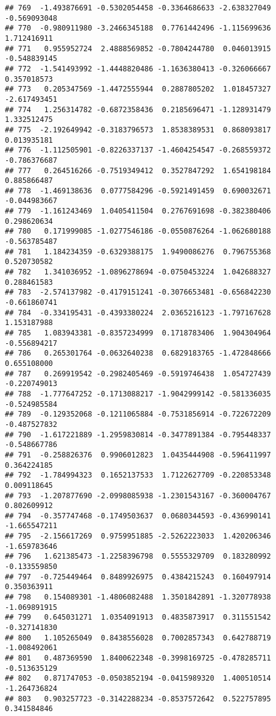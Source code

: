 \documentclass[
]{article}
\begin{document}
\begin{verbatim}
## 769  -1.493876691 -0.5302054458 -0.3364686633 -2.638327049 -0.569093048
## 770  -0.980911980 -3.2466345188  0.7761442496 -1.115699636  1.712416911
## 771   0.955952724  2.4888569852 -0.7804244780  0.046013915 -0.548839145
## 772  -1.541493992 -1.4448820486 -1.1636380413 -0.326066667  0.357018573
## 773   0.205347569 -1.4472555944  0.2887805202  1.018457327 -2.617493451
## 774   1.256314782 -0.6872358436  0.2185696471 -1.128931479  1.332512475
## 775  -2.192649942 -0.3183796573  1.8538389531  0.868093817  0.013935181
## 776  -1.112505901 -0.8226337137 -1.4604254547 -0.268559372 -0.786376687
## 777   0.264516266 -0.7519349412  0.3527847292  1.654198184  0.885866487
## 778  -1.469138636  0.0777584296 -0.5921491459  0.690032671 -0.044983667
## 779  -1.161243469  1.0405411504  0.2767691698 -0.382380406  0.298620634
## 780   0.171999085 -1.0277546186 -0.0550876264 -1.062680188 -0.563785487
## 781   1.184234359 -0.6329388175  1.9490086276  0.796755368  0.520730582
## 782   1.341036952 -1.0896278694 -0.0750453224  1.042688327  0.288461583
## 783  -2.574137982 -0.4179151241 -0.3076653481 -0.656842230 -0.661860741
## 784  -0.334195431 -0.4393380224  2.0365216123 -1.797167628  1.153187988
## 785   1.083943381 -0.8357234999  0.1718783406  1.904304964 -0.556894217
## 786   0.265301764 -0.0632640238  0.6829183765 -1.472848666  0.655108000
## 787   0.269919542 -0.2982405469 -0.5919746438  1.054727439 -0.220749013
## 788  -1.777647252 -0.1713088217 -1.9042999142 -0.581336035 -0.524985584
## 789  -0.129352068 -0.1211065884 -0.7531856914 -0.722672209 -0.487527832
## 790  -1.617221889 -1.2959830814 -0.3477891384 -0.795448337 -0.548667786
## 791  -0.258826376  0.9906012823  1.0435444908 -0.596411997  0.364224185
## 792  -1.784994323  0.1652137533  1.7122627709 -0.220853348  0.009118645
## 793  -1.207877690 -2.0998085938 -1.2301543167 -0.360004767  0.802609912
## 794  -0.357747468 -0.1749503637  0.0680344593 -0.436990141 -1.665547211
## 795  -2.156617269  0.9759951885 -2.5262223033  1.420206346 -1.659783646
## 796   1.621385473 -1.2258396798  0.5555329709  0.183280992 -0.133559850
## 797  -0.725449464  0.8489926975  0.4384215243  0.160497914  0.350363911
## 798   0.154089301 -1.4806082488  1.3501842891 -1.320778938 -1.069891915
## 799   0.645031271  1.0354091913  0.4835873917  0.311551542 -0.327141830
## 800   1.105265049  0.8438556028  0.7002857343  0.642788719 -1.008492061
## 801   0.487369590  1.8400622348 -0.3998169725 -0.478285711 -0.513635129
## 802   0.871747053 -0.0503852194 -0.0415989320  1.400510514 -1.264736824
## 803   0.903257723 -0.3142288234 -0.8537572642  0.522757895  0.341584846

\end{verbatim}
\end{document}
